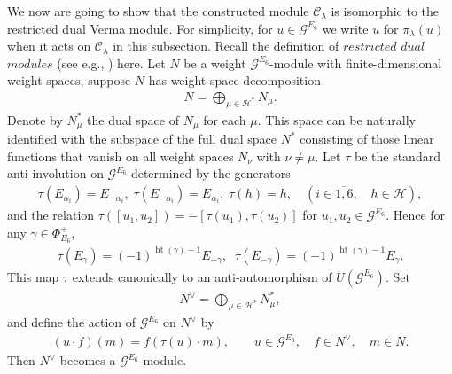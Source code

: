 \documentclass[12pt]{article}
\numberwithin{equation}{section}
\theoremstyle{definition}
\theoremstyle{remark}
\begin{document}
We now are going to show that the constructed module $\mathscr{C}_{\lambda}$ is isomorphic to the restricted dual Verma module. For simplicity, for $u\in\mathscr{G}^{E_6}$ we write $u$ for $\pi_{\lambda}(u)$ when it acts on $\mathscr{C}_{\lambda}$ in this subsection.
Recall the definition of $restricted$ $dual$ $modules$ (see e.g., \cite{Hum2}) here. Let $N$ be a weight $\mathscr{G}^{E_6}$-module with finite-dimensional weight spaces, suppose $N$ has weight space decomposition
\begin{eqnarray}
	N=\bigoplus_{\mu\in \mathscr{H}^*}N_{\mu}.
\end{eqnarray}
Denote by $N_{\mu}^*$ the dual space of $N_{\mu}$ for each $\mu$. This space can be naturally identified with the subspace of the full dual space $N^*$ consisting of those linear functions that vanish on all weight spaces $N_{\nu}$ with $\nu\neq\mu$. Let $\tau$ be the standard anti-involution on $\mathscr{G}^{E_6}$ determined by the generators
\begin{eqnarray}
	\tau(E_{\alpha_i})=E_{-\alpha_i},\;\tau(E_{-\alpha_i})=E_{\alpha_i},\;\tau(h)=h,\quad (i\in\overline{1,6},\quad h\in \mathscr{H}), 
\end{eqnarray}
and the relation $\tau([u_1,u_2])=-[\tau(u_1),\tau(u_2)]$ for $u_1,u_2\in\mathscr{G}^{E_6}$. Hence for any $\gamma\in\Phi_{E_6}^+$,
\begin{eqnarray}
	\tau(E_\gamma)=(-1)^{\operatorname{ht}(\gamma)-1}E_{-\gamma},\;\;\tau(E_{-\gamma})=(-1)^{\operatorname{ht}(\gamma)-1}E_{\gamma}.
\end{eqnarray}
This map $\tau$ extends canonically to an anti‑automorphism of $U(\mathscr{G}^{E_6})$.
Set
\begin{eqnarray}
	N^{\vee}=\bigoplus_{\mu\in \mathscr{H}^*}N_{\mu}^{*},\label{dual1}
\end{eqnarray}
and define the action of $\mathscr{G}^{E_6}$ on $N^{\vee}$ by
\begin{eqnarray}
	(u\cdot f)(m)=f(\tau(u)\cdot m),\qquad u\in\mathscr{G}^{E_6},\quad f\in N^{\vee},\quad m\in N. \label{dual3}
\end{eqnarray}
Then $N^{\vee}$ becomes a $\mathscr{G}^{E_6}$-module.
\end{document}
